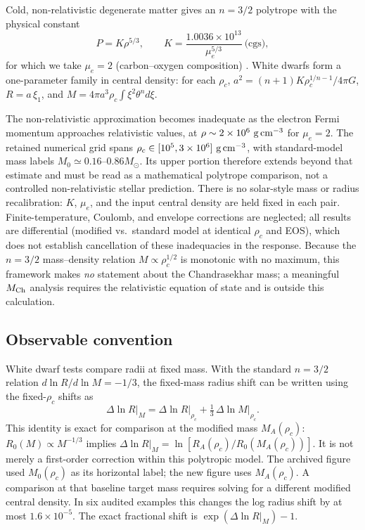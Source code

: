 \documentclass[twocolumn,prd,superscriptaddress,nofootinbib]{revtex4-2}
\begin{document}
Cold, non-relativistic degenerate matter gives an $n = 3/2$ polytrope
with the physical constant
\begin{equation}
P = K\rho^{5/3}, \qquad
K = \frac{1.0036\times10^{13}}{\mu_e^{5/3}}~\text{(cgs)},
\end{equation}
for which we take $\mu_e = 2$ (carbon--oxygen composition)
\cite{Chandrasekhar1939,HamadaSalpeter1961}. White dwarfs form a
one-parameter family in central density: for each $\rho_c$,
$a^2 = (n{+}1)K\rho_c^{1/n-1}/4\pi G$, $R = a\,\xi_1$, and
$M = 4\pi a^3\rho_c\!\int\!\xi^2\theta^n d\xi$.

The non-relativistic approximation becomes inadequate as the electron
Fermi momentum approaches relativistic values, at
$\rho \sim 2\times10^{6}~{\rm g\,cm^{-3}}$ for $\mu_e=2$.
The retained numerical grid spans
$\rho_c \in [10^5,3\times10^6]~{\rm g\,cm^{-3}}$, with standard-model
mass labels $M_0\simeq0.16$--$0.86M_\odot$. Its upper portion therefore
extends beyond that estimate and must be read as a mathematical
polytrope comparison, not a controlled non-relativistic stellar prediction.
There is no solar-style mass or radius recalibration: $K$, $\mu_e$,
and the input central density are held fixed in each pair. Finite-temperature,
Coulomb, and envelope corrections are neglected; all results are differential
(modified vs.\ standard model at identical $\rho_c$ and EOS), which
does not establish cancellation of these inadequacies in the response. Because the $n = 3/2$
mass--density relation $M \propto \rho_c^{1/2}$ is monotonic with no
maximum, this framework makes \emph{no} statement about the Chandrasekhar
mass; a meaningful $M_{\rm Ch}$ analysis requires the relativistic
equation of state and is outside this calculation.

\subsection{Observable convention}

White dwarf tests compare radii at fixed mass. With the standard
$n = 3/2$ relation $d\ln R/d\ln M = -1/3$, the fixed-mass radius shift
can be written using the fixed-$\rho_c$ shifts as
\begin{equation}
\Delta\ln R\big|_M = \Delta\ln R\big|_{\rho_c}
+ \tfrac{1}{3}\,\Delta\ln M\big|_{\rho_c}.
\label{eq:fixedM}
\end{equation}
This identity is exact for comparison at the modified mass $M_A(\rho_c)$:
$R_0(M)\propto M^{-1/3}$ implies
$\Delta\ln R|_M=\ln[R_A(\rho_c)/R_0(M_A(\rho_c))]$.
It is not merely a first-order correction within this polytropic model.
The archived figure used $M_0(\rho_c)$ as its horizontal label; the new figure uses $M_A(\rho_c)$.
A comparison at that baseline target mass requires solving for a different
modified central density. In six audited examples this changes the log
radius shift by at most $1.6\times10^{-5}$.
The exact fractional shift is $\exp(\Delta\ln R|_M)-1$.
\end{document}

